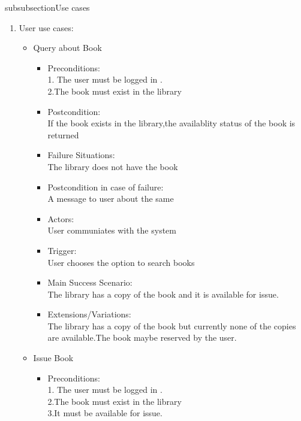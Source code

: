 \documentclass{article}
\begin{document}
subsubsection{Use cases}
\begin{enumerate}
\item User use cases:
	\begin{itemize}
	
	\item Query about Book\\
	\begin{itemize}
	\item Preconditions:\\
	1. The user must be logged in .\\
	2.The book must exist in the library\\
\item  Postcondition: \\If the book exists in the library,the availablity status of the book is returned\\
 \item Failure Situations:\\ The library does not have  the book \\
 \item Postcondition in case of failure:\\A message to user about the same\\
\item  Actors:\\ User communiates with the system\\
\item  Trigger:\\ User chooses the option to search books\\
 \item Main Success Scenario: \\The library has a copy of the book and it is available for issue.\\
\item  Extensions/Variations: \\The library has a copy of the book but currently none of the copies are available.The book maybe reserved by the user.
	\end{itemize}
 \item Issue Book\\
	\begin{itemize}
	 \item Preconditions:\\
	 1. The user must be logged in .\\
	 2.The book must exist in the library \\
	 3.It must be available for issue.\\

\end{itemize}
\end{itemize}
\end{enumerate}
\end{document}
